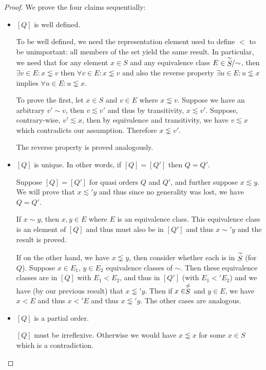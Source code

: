 \documentclass[12pt]{article}
\theoremstyle{definition}
\theoremstyle{theorem}
\begin{document}
\begin{proof}
  We prove the four claims sequentially:
  \begin{itemize}
  \item $[Q]$ is well defined.\par
    To be well defined, we need the representation element used to
    define $<$ to be unimportant: all members of the set yield the
    same result.  In particular, we need that for any element $x \in
    S$ and any equivalence class
    $E \in {\stackrel{\sim}{S}\!\!/{\mathord\sim}}$, then $\exists v\in E: x \lnsim v$
    then $\forall v \in E: x \lnsim v$ and also the reverse property
    $\exists u\in E: u \lnsim x$ implies
    $\forall u\in E: u \lnsim x$.

    To prove the first, let $x \in S$ and $v \in E$ where
    $x \lnsim v$.  Suppose we have an arbitrary $v' \sim v$, then
    $v \lesssim v'$ and thus by transitivity, $x \lesssim v'$.
    Suppose, contrary-wise, $v' \lesssim x$, then by equivalence and
    transitivity, we have $v \lesssim x$ which contradicts our
    assumption.  Therefore $x \lnsim v'$.

    The reverse property is proved analogously.

  \item $[Q]$ is unique.  In other words,
    if $[Q] = [Q']$ then $Q = Q'$.

    Suppose $[Q] = [Q']$ for quasi orders $Q$ and $Q'$,
    and further suppose $x \lesssim y$.  We will prove that
    $x \lesssim' y$ and thus since no generality was lost, we have $Q = Q'$.

    If $x \sim y$, then $x,y \in E$ where $E$ is an equivalence class.
    This equivalence class is an element of $[Q]$ and thus must also be
    in $[Q']$ and thus $x \sim' y$ and the result is proved.

    If on the other hand, we have $x \lnsim y$, then consider whether
    each is in $\stackrel{\sim}{S}$ (for $Q$).  Suppose $x \in E_1$,
    $y \in E_2$ equivalence classes of $\sim$.  Then these equivalence
    classes are in $[Q]$ with $E_1 < E_2$, and thus in $[Q']$ (with
    $E_1 <' E_2$) and we have (by our previous result) that
    $x \lnsim' y$.   Then if $x \in \stackrel{\not\sim}{S}$ and $y \in E$, we
    have $x < E$ and thus $x <' E$ and thus $x \lnsim' y$.  The other
    cases are analogous.

  \item $[Q]$ is a partial order.

    $[Q]$ must be irreflexive.  Otherwise we would have $x \lnsim x$
    for some $x \in S$ which is a contradiction.
    

\end{itemize}
\end{proof}
\end{document}
